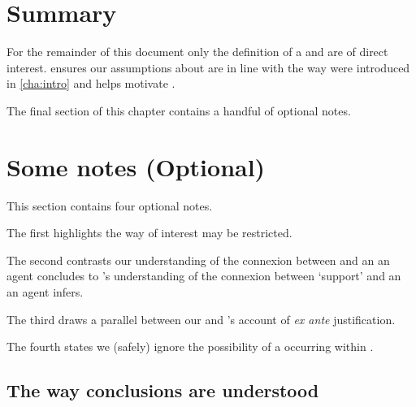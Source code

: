 \section*{Summary}


\begin{note}
  For the remainder of this document only the definition of a \wit{} and \supportII{} are of direct interest.
  \supportI{} ensures our assumptions about \fingfr{} are in line with the way  were introduced in \autoref{cha:intro} and helps motivate \supportII{}.
\end{note}


\begin{note}
  The final section of this chapter contains a handful of optional notes.
\end{note}



\section[Some notes]{Some notes \hfill (Optional)}


\begin{note}
  This section contains four optional notes.

  The first highlights the way  of interest may be restricted.

  The second contrasts our understanding of the connexion between  and an  an agent concludes to \citeauthor{Boghossian:2014aa}'s understanding of the connexion between `support' and an  an agent infers.

  The third draws a parallel between our \supportII{} and \citeauthor{Goldman:1979ui}'s account of \emph{ex ante} justification.

  The fourth states we (safely) ignore the possibility of a \fingfr{} occurring within \fingfr{}.
\end{note}


\subsection*{The way conclusions are understood}


